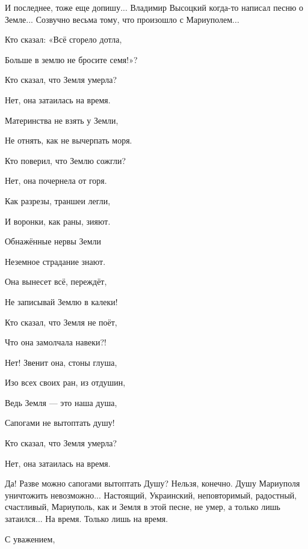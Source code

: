 И последнее, тоже еще допишу... Владимир Высоцкий когда-то написал песню о Земле...
Созвучно весьма тому, что произошло с Мариуполем... 

\raggedcolumns
\begin{multicols}{2} %
\setlength{\parindent}{0pt}

Кто сказал: «Всё сгорело дотла,\par
Больше в землю не бросите семя!»?\par
Кто сказал, что Земля умерла?\par
Нет, она затаилась на время.\par
\par
Материнства не взять у Земли,\par
Не отнять, как не вычерпать моря.\par
Кто поверил, что Землю сожгли?\par
Нет, она почернела от горя.\par
\par
Как разрезы, траншеи легли,\par
И воронки, как раны, зияют.\par
Обнажённые нервы Земли\par
Неземное страдание знают.\par
\par
Она вынесет всё, переждёт,\par
Не записывай Землю в калеки!\par
Кто сказал, что Земля не поёт,\par
Что она замолчала навеки?!\par
\par
Нет! Звенит она, стоны глуша,\par
Изо всех своих ран, из отдушин,\par
Ведь Земля — это наша душа,\par
Сапогами не вытоптать душу!\par
\par
Кто сказал, что Земля умерла?\par
Нет, она затаилась на время.\par
\end{multicols} %

Да! Разве можно сапогами вытоптать Душу? Нельзя, конечно. Душу Мариуполя
уничтожить невозможно...  Настоящий, Украинский, неповторимый, радостный,
счастливый, Мариуполь, как и Земля в этой песне, не умер, а только лишь
затаился... На время. Только лишь на время.

С уважением,

